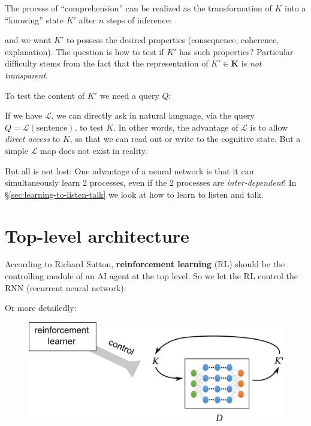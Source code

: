 \documentclass[12pt]{article}
\begin{document}
The process of ``comprehension'' can be realized as the transformation of $K$ into a ``knowing'' state $K'$ after $n$ steps of inference:
\begin{center}
\end{center}
and we want $K'$ to possess the desired properties (consequence, coherence, explanation).  The question is how to test if $K'$ has such properties?  Particular difficulty stems from the fact that the representation of $K' \in \mathbf{K}$ is \textit{not transparent}.

To test the content of $K'$ we need a query $Q$:
\begin{center}
\end{center}

If we have $\mathcal{L}$, we can directly ask in natural language, via the query $Q = \mathcal{L}(\mbox{sentence})$, to test $K$.  In other words, the advantage of $\mathcal{L}$ is to allow \textit{direct access} to $K$, so that we can read out or write to the cognitive state.  But a simple $\mathcal{L}$ map does not exist in reality.

But all is not lost:  One advantage of a neural network is that it can simultaneously learn 2 processes, even if the 2 processes are \textit{inter-dependent}!  In \S\ref{sec:learning-to-listen-talk} we look at how to learn to listen and talk.

\section{Top-level architecture}

According to Richard Sutton, \textbf{reinforcement learning} (RL) should be the controlling module of an AI agent at the top level.  So we let the RL control the RNN (recurrent neural network):
\begin{center}
\end{center}

Or more detailedly:
\begin{figure}[H]
\centering
\includegraphics[scale=0.75]{genifer-model-0.png}
\end{figure}
\end{document}
